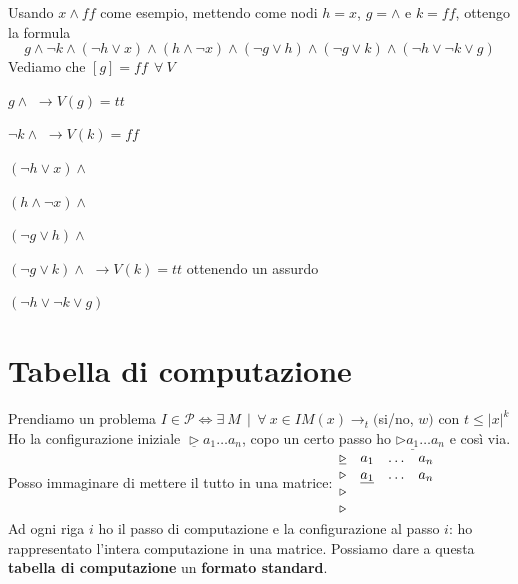 \documentclass[10pt]{book}
\begin{document}
Usando $x \wedge ff$ come esempio, mettendo come nodi $h = x$, $g = \wedge$ e $k = ff$, ottengo la formula $$g \wedge \neg k \wedge (\neg h \vee x) \wedge (h \wedge \neg x) \wedge(\neg g \vee h) \wedge (\neg g \vee k) \wedge (\neg h \vee \neg k \vee g)$$
Vediamo che $[g] = ff\:\:\forall\:V$
\begin{list}{}{}
	\item $g \wedge$ $\longrightarrow V(g) = tt$ 
	\item $\neg k \wedge$ $\longrightarrow V(k) = ff$
	\item $(\neg h \vee x) \wedge$ 
	\item $(h \wedge \neg x) \wedge$
	\item $(\neg g \vee h) \wedge$
	\item $(\neg g \vee k) \wedge$ $\longrightarrow V(k) = tt$ ottenendo un assurdo
	\item $(\neg h \vee \neg k \vee g)$
\end{list}
\section{Tabella di computazione}
Prendiamo un problema $I \in \mathscr{P} \Leftrightarrow \exists\:M\:\:|\:\:\forall\:x \in I M(x)\longrightarrow_t ($si/no, $w)$ con $t \leq |x|^k$\\
Ho la configurazione iniziale $\underline{\triangleright}a_1\ldots a_n$, copo un certo passo ho $\triangleright\underline{a_1}\ldots a_n$ e così via.\\
Posso immaginare di mettere il tutto in una matrice:$\begin{array}{c c c c}
\underline{\triangleright} &a_1&\ldots & a_n\\
\triangleright&\underline{a_1}&\ldots& a_n\\
\triangleright\\
\triangleright\\
\end{array}$\\
Ad ogni riga $i$ ho il passo di computazione e la configurazione al passo $i$: ho rappresentato l'intera computazione in una matrice. Possiamo dare a questa \textbf{tabella di computazione} un \textbf{formato standard}.
\pagebreak
\end{document}
